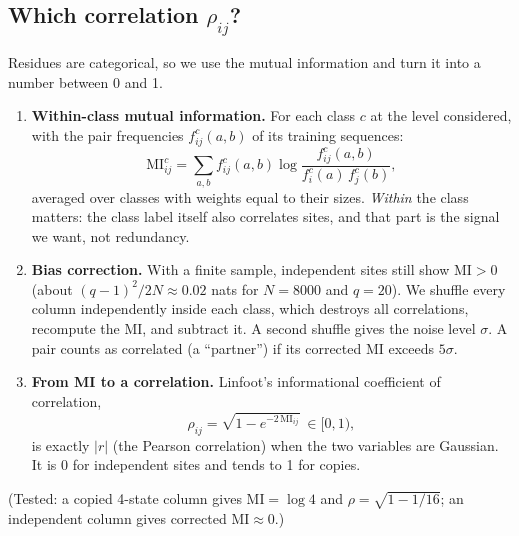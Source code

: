 \documentclass[11pt,a4paper]{article}
\begin{document}
\subsection{Which correlation $\rho_{ij}$?}
Residues are categorical, so we use the mutual information and turn it into a number between 0 and 1.
\begin{enumerate}[nosep]
\item \textbf{Within-class mutual information.} For each class $c$ at the level considered, with the pair frequencies
$f^c_{ij}(a,b)$ of its training sequences:
\[
\mathrm{MI}^c_{ij}=\sum_{a,b}f^c_{ij}(a,b)\log\frac{f^c_{ij}(a,b)}{f^c_i(a)\,f^c_j(b)} ,
\]
averaged over classes with weights equal to their sizes. \emph{Within} the class matters: the class label itself also
correlates sites, and that part is the signal we want, not redundancy.
\item \textbf{Bias correction.} With a finite sample, independent sites still show $\mathrm{MI}>0$ (about
$(q-1)^2/2N\approx0.02$ nats for $N=8000$ and $q=20$). We shuffle every column independently inside each class, which
destroys all correlations, recompute the MI, and subtract it. A second shuffle gives the noise level $\sigma$. A pair
counts as correlated (a ``partner'') if its corrected MI exceeds $5\sigma$.
\item \textbf{From MI to a correlation.} Linfoot's informational coefficient of correlation,
\[
\rho_{ij}=\sqrt{1-e^{-2\,\mathrm{MI}_{ij}}}\ \in[0,1) ,
\]
is exactly $|r|$ (the Pearson correlation) when the two variables are Gaussian. It is 0 for independent sites and tends
to 1 for copies.
\end{enumerate}
(Tested: a copied 4-state column gives $\mathrm{MI}=\log4$ and $\rho=\sqrt{1-1/16}$; an independent column gives
corrected $\mathrm{MI}\approx0$.)
\end{document}
